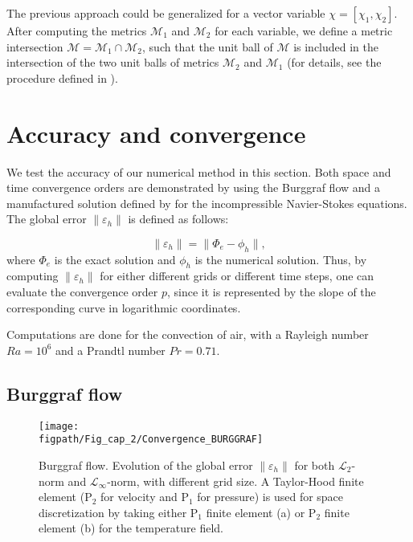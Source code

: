 The previous approach could be generalized for a vector variable $\chi=[\chi_1, \chi_2]$.
After computing the metrics $\mathcal{M}_{1}$ and $\mathcal{M}_{2}$ for each variable, we define a metric intersection  $\mathcal{M} = \mathcal{M}_{1} \cap \mathcal{M}_{2}$,
such that the unit ball of $\mathcal{M}$ is included in  the intersection of the two  unit balls  of metrics $\mathcal{M}_{2}$ and $\mathcal{M}_{1}$ (for details, see the  procedure defined in \cite{frey-george-1999}). 




\section{Accuracy and convergence} \label{subsec-conv}
We test the accuracy of our numerical method in this section.
Both space and time convergence orders are demonstrated by using the Burggraf flow and a manufactured solution defined by \cite{nourgaliev2016fully} for the incompressible Navier-Stokes equations.
The global error $ \| \varepsilon_h \|$ is defined as follows:

\begin{equation}
  \| \varepsilon_h \| = \| \Phi_e - \phi_h \|,
\end{equation}
where $\Phi_e$ is the exact solution and $\phi_h$ is the numerical solution.
Thus, by computing $\| \varepsilon_h \|$ for either different grids or different time steps, one can evaluate the convergence order $p$, since it is represented by the slope of the corresponding curve in logarithmic coordinates.

Computations are done for the convection of air, with a Rayleigh number $Ra = 10^6$ and a Prandtl number $Pr = 0.71$.

\subsection{Burggraf flow} \label{subsub-conv-burg}

\begin{figure}
	\begin{center}
		\texttt{[image: \\figpath/Fig\_cap\_2/Convergence\_BURGGRAF]} 
	\end{center}
	\caption{Burggraf flow. Evolution of the global error $\| \varepsilon_h \|$ for both $\mathcal{L}_2$-norm and $\mathcal{L}_\infty$-norm, with different grid size. A Taylor-Hood finite element (P$_2$ for velocity and P$_1$ for pressure) is used for space discretization by taking either P$_1$ finite element (a) or P$_2$ finite element (b) for the temperature field.}
	\label{fig-conv-burggraf}
\end{figure}

